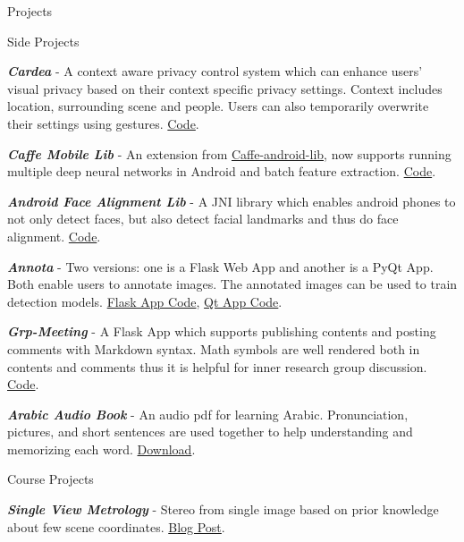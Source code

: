 \documentclass{resume} %
\begin{document}
\begin{rSection}{Projects}

\begin{rSubsection}{Side Projects}{}{}{}

\item {\bf\em Cardea} - A context aware privacy control system which can enhance users' visual privacy based on their context specific privacy settings. Context includes location, surrounding scene and people. Users can also temporarily overwrite their settings using gestures. \href{https://github.com/ZhengRui/cardea}{Code}.

\item {\bf\em Caffe Mobile Lib} - An extension from \href{https://github.com/sh1r0/caffe-android-lib}{Caffe-android-lib}, now supports running multiple deep neural networks in Android and batch feature extraction. \href{https://github.com/ZhengRui/caffe-android-lib}{Code}.

\item {\bf\em Android Face Alignment Lib} - A JNI library which enables android phones to not only detect faces, but also detect facial landmarks and thus do face alignment. \href{https://github.com/ZhengRui/FaceAlignmentJNI}{Code}.

\item {\bf\em Annota} - Two versions: one is a Flask Web App and another is a PyQt App. Both enable users to annotate images. The annotated images can be used to train detection models. \href{https://github.com/ZhengRui/ImgAnnotaWeb}{Flask App Code}, \href{https://github.com/ZhengRui/ImgAnnotaPyQt4}{Qt App Code}.

\item {\bf\em Grp-Meeting} - A Flask App which supports publishing contents and posting comments with Markdown syntax. Math symbols are well rendered both in contents and comments thus it is helpful for inner research group discussion. \href{https://github.com/ZhengRui/grpmeeting}{Code}.

\item {\bf\em Arabic Audio Book} - An audio pdf for learning Arabic. Pronunciation, pictures, and short sentences are used together to help understanding and memorizing each word. \href{http://bit.ly/28Qbqj2}{Download}.

\end{rSubsection}

\begin{rSubsection}{Course Projects}{}{}{}

\item {\bf\em Single View Metrology} - Stereo from single image based on prior knowledge about few scene coordinates. \href{http://zhengrui.github.io/singleviewmetrology.html}{Blog Post}.


\end{rSubsection}
\end{rSection}
\end{document}
